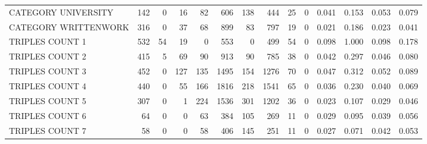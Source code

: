 \begin{tabular}{lrrrrrrrrrllll}
 CATEGORY UNIVERSITY      &             142 &             0 &              16 &              82 &             606 &  138 &  444 &   25 &    0 & 0.041 & 0.153 & 0.053 & 0.079 \\
 CATEGORY WRITTENWORK     &             316 &             0 &              37 &              68 &             899 &   83 &  797 &   19 &    0 & 0.021 & 0.186 & 0.023 & 0.041 \\
 TRIPLES COUNT 1          &             532 &            54 &              19 &               0 &             553 &    0 &  499 &   54 &    0 & 0.098 & 1.000 & 0.098 & 0.178 \\
 TRIPLES COUNT 2          &             415 &             5 &              69 &              90 &             913 &   90 &  785 &   38 &    0 & 0.042 & 0.297 & 0.046 & 0.080 \\
 TRIPLES COUNT 3          &             452 &             0 &             127 &             135 &            1495 &  154 & 1276 &   70 &    0 & 0.047 & 0.312 & 0.052 & 0.089 \\
 TRIPLES COUNT 4          &             440 &             0 &              55 &             166 &            1816 &  218 & 1541 &   65 &    0 & 0.036 & 0.230 & 0.040 & 0.069 \\
 TRIPLES COUNT 5          &             307 &             0 &               1 &             224 &            1536 &  301 & 1202 &   36 &    0 & 0.023 & 0.107 & 0.029 & 0.046 \\
 TRIPLES COUNT 6          &              64 &             0 &               0 &              63 &             384 &  105 &  269 &   11 &    0 & 0.029 & 0.095 & 0.039 & 0.056 \\
 TRIPLES COUNT 7          &              58 &             0 &               0 &              58 &             406 &  145 &  251 &   11 &    0 & 0.027 & 0.071 & 0.042 & 0.053 \\
\hline
\end{tabular}